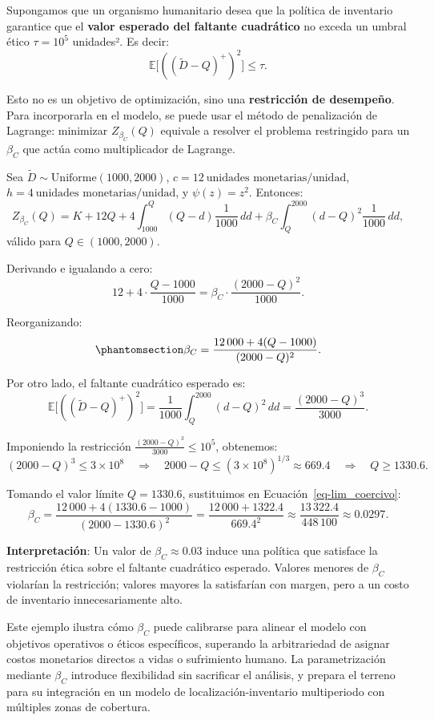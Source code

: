 \documentclass[
  spanish,
  us-letterpaper,
]{scrreprt}
\numberwithin{equation}{section}
\begin{document}
Supongamos que un organismo humanitario desea que la política de
inventario garantice que el \textbf{valor esperado del faltante
cuadrático} no exceda un umbral ético \(\tau = 10^5\) unidades². Es
decir: \[
\mathbb{E}\big[((\tilde{D} - Q)^+)^2\big] \leq \tau.
\]

Esto no es un objetivo de optimización, sino una \textbf{restricción de
desempeño}. Para incorporarla en el modelo, se puede usar el método de
penalización de Lagrange: minimizar \(Z_{\beta_C}(Q)\) equivale a
resolver el problema restringido para un \(\beta_C\) que actúa como
multiplicador de Lagrange.

Sea \(\tilde{D} \sim \text{Uniforme}(1000, 2000)\),
\(c = 12~\text{unidades monetarias/unidad}\),
\(h = 4~\text{unidades monetarias/unidad}\), y \(\psi(z) = z^2\).
Entonces: \[
Z_{\beta_C}(Q) = K + 12Q + 4 \int_{1000}^Q (Q - d) \frac{1}{1000} \, dd + \beta_C \int_Q^{2000} (d - Q)^2 \frac{1}{1000} \, dd,
\] válido para \(Q \in (1000, 2000)\).

Derivando e igualando a cero: \[
12 + 4 \cdot \frac{Q - 1000}{1000} = \beta_C \cdot \frac{(2000 - Q)^2}{1000}.
\]

Reorganizando: \begin{equation}\phantomsection\label{eq-reo}{
\beta_C = \frac{12\,000 + 4(Q - 1000)}{(2000 - Q)^2}.
}\end{equation}

Por otro lado, el faltante cuadrático esperado es: \[
\mathbb{E}\big[((\tilde{D} - Q)^+)^2\big] = \frac{1}{1000} \int_Q^{2000} (d - Q)^2 \, dd = \frac{(2000 - Q)^3}{3000}.
\]

Imponiendo la restricción \(\frac{(2000 - Q)^3}{3000} \leq 10^5\),
obtenemos: \[
(2000 - Q)^3 \leq 3 \times 10^8 \quad \Rightarrow \quad 2000 - Q \leq (3 \times 10^8)^{1/3} \approx 669.4 \quad \Rightarrow \quad Q \geq 1330.6.
\]

Tomando el valor límite \(Q = 1330.6\), sustituimos en
Ecuación~\ref{eq-lim_coercivo}: \[
\beta_C = \frac{12\,000 + 4(1330.6 - 1000)}{(2000 - 1330.6)^2} = \frac{12\,000 + 1322.4}{669.4^2} \approx \frac{13\,322.4}{448\,100} \approx 0.0297.
\]

\textbf{Interpretación}: Un valor de \(\beta_C \approx 0.03\) induce una
política que satisface la restricción ética sobre el faltante cuadrático
esperado. Valores menores de \(\beta_C\) violarían la restricción;
valores mayores la satisfarían con margen, pero a un costo de inventario
innecesariamente alto.

Este ejemplo ilustra cómo \(\beta_C\) puede calibrarse para alinear el
modelo con objetivos operativos o éticos específicos, superando la
arbitrariedad de asignar costos monetarios directos a vidas o
sufrimiento humano. La parametrización mediante \(\beta_C\) introduce
flexibilidad sin sacrificar el análisis, y prepara el terreno para su
integración en un modelo de localización-inventario multiperiodo con
múltiples zonas de cobertura.
\end{document}
